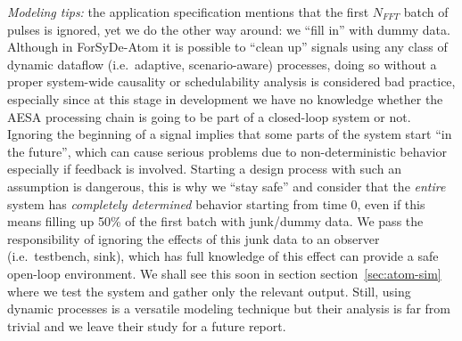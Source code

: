 \documentclass[
  a4paper,
]{article}
\begin{document}
\emph{Modeling tips:} the application specification mentions that the
first \(N_{FFT}\) batch of pulses is ignored, yet we do the other way
around: we ``fill in'' with dummy data. Although in ForSyDe-Atom it is
possible to ``clean up'' signals using any class of dynamic dataflow
(i.e.~adaptive, scenario-aware) processes, doing so without a proper
system-wide causality or schedulability analysis is considered bad
practice, especially since at this stage in development we have no
knowledge whether the AESA processing chain is going to be part of a
closed-loop system or not. Ignoring the beginning of a signal implies
that some parts of the system start ``in the future'', which can cause
serious problems due to non-deterministic behavior especially if
feedback is involved. Starting a design process with such an assumption
is dangerous, this is why we ``stay safe'' and consider that the
\emph{entire} system has \emph{completely determined} behavior starting
from time 0, even if this means filling up 50\% of the first batch with
junk/dummy data. We pass the responsibility of ignoring the effects of
this junk data to an observer (i.e.~testbench, sink), which has full
knowledge of this effect can provide a safe open-loop environment. We
shall see this soon in section section~\ref{sec:atom-sim} where we test
the system and gather only the relevant output. Still, using dynamic
processes is a versatile modeling technique but their analysis is far
from trivial and we leave their study for a future report.
\end{document}
